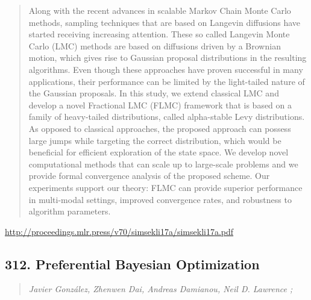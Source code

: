 \documentclass{article}
\begin{document}
\begin{quote}
    Along with the recent advances in scalable Markov Chain Monte Carlo methods, sampling techniques that are based on Langevin diffusions have started receiving increasing attention. These so called Langevin Monte Carlo (LMC) methods are based on diffusions driven by a Brownian motion, which gives rise to Gaussian proposal distributions in the resulting algorithms. Even though these approaches have proven successful in many applications, their performance can be limited by the light-tailed nature of the Gaussian proposals. In this study, we extend classical LMC and develop a novel Fractional LMC (FLMC) framework that is based on a family of heavy-tailed distributions, called alpha-stable Levy distributions. As opposed to classical approaches, the proposed approach can possess large jumps while targeting the correct distribution, which would be beneficial for efficient exploration of the state space. We develop novel computational methods that can scale up to large-scale problems and we provide formal convergence analysis of the proposed scheme. Our experiments support our theory: FLMC can provide superior performance in multi-modal settings, improved convergence rates, and robustness to algorithm parameters.  \end{quote}

\href{http://proceedings.mlr.press/v70/simsekli17a/simsekli17a.pdf}{http://proceedings.mlr.press/v70/simsekli17a/simsekli17a.pdf}

\subsection{312. Preferential Bayesian Optimization}

\begin{quote}
\footnotesize{\textit{Javier González, Zhenwen Dai, Andreas Damianou, Neil D. Lawrence ;}}
\end{quote}
\end{document}
